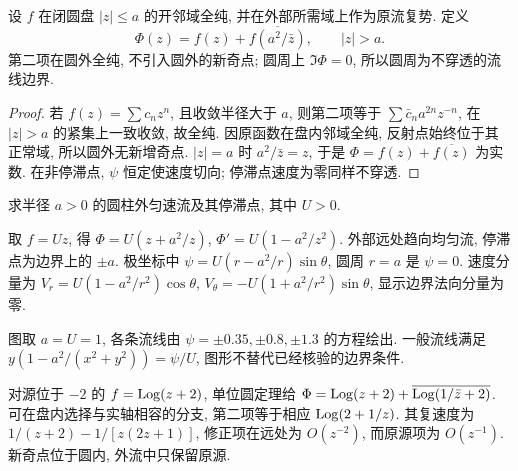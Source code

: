 \begin{theorem}
设 $f$ 在闭圆盘 $|z|\le a$ 的开邻域全纯, 并在外部所需域上作为原流复势. 定义
\[
\Phi(z)=f(z)+\overline{f(a^2/\bar z)},\qquad |z|>a.
\]
第二项在圆外全纯, 不引入圆外的新奇点; 圆周上 $\Im\Phi=0$, 所以圆周为不穿透的流线边界.
\end{theorem}
\begin{proof}
若 $f(z)=\sum c_nz^n$, 且收敛半径大于 $a$, 则第二项等于 $\sum\bar c_na^{2n}z^{-n}$, 在 $|z|>a$ 的紧集上一致收敛, 故全纯. 因原函数在盘内邻域全纯, 反射点始终位于其正常域, 所以圆外无新增奇点. $|z|=a$ 时 $a^2/\bar z=z$, 于是 $\Phi=f(z)+\overline{f(z)}$ 为实数. 在非停滞点, $\psi$ 恒定使速度切向; 停滞点速度为零同样不穿透.
\end{proof}
\begin{example}
求半径 $a>0$ 的圆柱外匀速流及其停滞点, 其中 $U>0$.
\end{example}
\begin{solution}
取 $f=Uz$, 得 $\Phi=U(z+a^2/z)$, $\Phi'=U(1-a^2/z^2)$. 外部远处趋向均匀流, 停滞点为边界上的 $\pm a$. 极坐标中 $\psi=U(r-a^2/r)\sin\theta$, 圆周 $r=a$ 是 $\psi=0$. 速度分量为 $V_r=U(1-a^2/r^2)\cos\theta$, $V_\theta=-U(1+a^2/r^2)\sin\theta$, 显示边界法向分量为零.
\end{solution}
\begin{center}
\end{center}
图取 $a=U=1$, 各条流线由 $\psi=\pm0.35,\pm0.8,\pm1.3$ 的方程绘出. 一般流线满足 $y(1-a^2/(x^2+y^2))=\psi/U$, 图形不替代已经核验的边界条件.

对源位于 $-2$ 的 $f=\operatorname{Log}(z+2)$, 单位圆定理给 $\Phi=\operatorname{Log}(z+2)+\overline{\operatorname{Log}(1/\bar z+2)}$. 可在盘内选择与实轴相容的分支, 第二项等于相应 $\operatorname{Log}(2+1/z)$. 其复速度为 $1/(z+2)-1/[z(2z+1)]$, 修正项在远处为 $O(z^{-2})$, 而原源项为 $O(z^{-1})$. 新奇点位于圆内, 外流中只保留原源.


